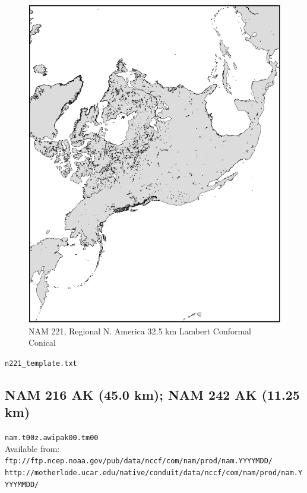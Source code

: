 \documentclass[11pt]{article}   %
\begin{document}
\begin{figure}[htbp]\begin{center}
 \includegraphics[angle=-90,scale=1.0]{Figs/n221.pdf}
\parbox{15cm}{\caption{\label{FigNAM221}
NAM 221, Regional N. America 32.5 km Lambert Conformal Conical
}}
\end{center}\end{figure}
\clearpage
\verb|n221_template.txt| \\
\tiny  \normalsize


\clearpage
\subsection{NAM 216 AK (45.0 km); NAM 242 AK (11.25 km)}

\verb|nam.t00z.awipak00.tm00|\\
Available from:\\
\verb|ftp://ftp.ncep.noaa.gov/pub/data/nccf/com/nam/prod/nam.YYYYMDD/| \\
\verb|http://motherlode.ucar.edu/native/conduit/data/nccf/com/nam/prod/nam.YYYYMMDD/|\\
\end{document}
